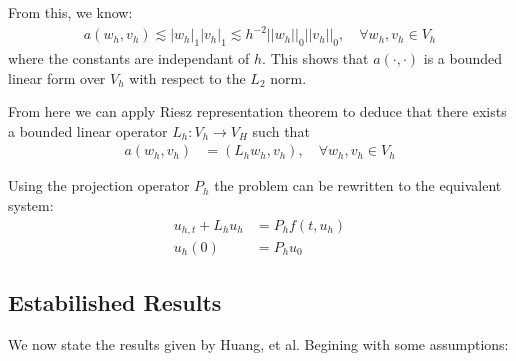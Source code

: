 From this, we know:
\begin{align}
    a(w_h, v_h) \lesssim |w_h|_1|v_h|_1 \lesssim h^{-2} ||w_h||_0||v_h||_0, \quad \forall w_h, v_h \in V_h \label{bilinear}
\end{align}
where the constants are independant of $h$.
This shows that $a(\cdot,\cdot)$ is a bounded linear form over $V_h$ with respect to the $L_2$ norm.

From here we can apply Riesz representation theorem to deduce that there exists a bounded linear operator $L_h:V_h\rightarrow V_H$ such that
\begin{align*}
    a(w_h, v_h) &= (L_h w_h, v_h), \quad \forall w_h, v_h \in V_h
\end{align*}

Using the projection operator $P_h$ the problem can be rewritten to the equivalent system:
\begin{align*}
    u_{h,t} + L_hu_h &= P_hf(t,u_h)\\
    u_h(0) &= P_hu_0
\end{align*}

\subsection{Estabilished Results}
We now state the results given by Huang, et al\cite{Huang2022}.
Begining with some assumptions:

